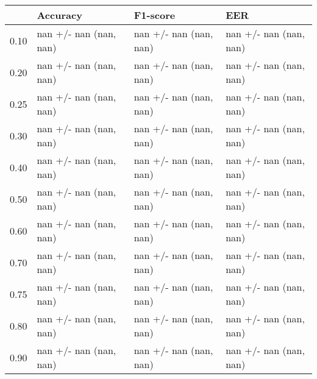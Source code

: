\begin{tabular}{llll}
\toprule
{} &                Accuracy &                F1-score &                     EER \\
\midrule
0.10 &  nan +/- nan (nan, nan) &  nan +/- nan (nan, nan) &  nan +/- nan (nan, nan) \\
0.20 &  nan +/- nan (nan, nan) &  nan +/- nan (nan, nan) &  nan +/- nan (nan, nan) \\
0.25 &  nan +/- nan (nan, nan) &  nan +/- nan (nan, nan) &  nan +/- nan (nan, nan) \\
0.30 &  nan +/- nan (nan, nan) &  nan +/- nan (nan, nan) &  nan +/- nan (nan, nan) \\
0.40 &  nan +/- nan (nan, nan) &  nan +/- nan (nan, nan) &  nan +/- nan (nan, nan) \\
0.50 &  nan +/- nan (nan, nan) &  nan +/- nan (nan, nan) &  nan +/- nan (nan, nan) \\
0.60 &  nan +/- nan (nan, nan) &  nan +/- nan (nan, nan) &  nan +/- nan (nan, nan) \\
0.70 &  nan +/- nan (nan, nan) &  nan +/- nan (nan, nan) &  nan +/- nan (nan, nan) \\
0.75 &  nan +/- nan (nan, nan) &  nan +/- nan (nan, nan) &  nan +/- nan (nan, nan) \\
0.80 &  nan +/- nan (nan, nan) &  nan +/- nan (nan, nan) &  nan +/- nan (nan, nan) \\
0.90 &  nan +/- nan (nan, nan) &  nan +/- nan (nan, nan) &  nan +/- nan (nan, nan) \\
\bottomrule
\end{tabular}
